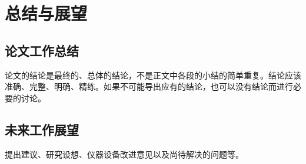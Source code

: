  \setlength{\baselineskip}{20pt}
\chapter{总结与展望}
\label{cha:chap7}



\section{论文工作总结}

论文的结论是最终的、总体的结论，不是正文中各段的小结的简单重复。结论应该准确、完整、明确、精练。如果不可能导出应有的结论，也可以没有结论而进行必要的讨论。



\section{未来工作展望}

提出建议、研究设想、仪器设备改进意见以及尚待解决的问题等。